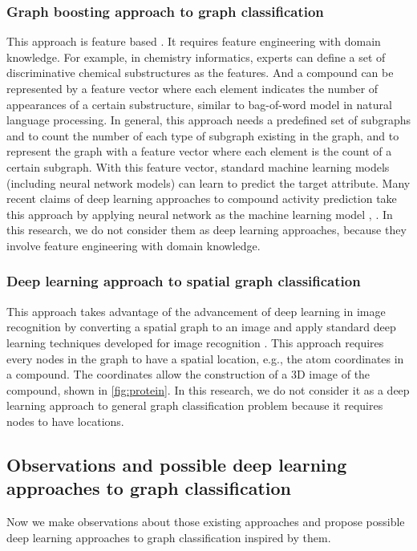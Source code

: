 \documentclass{article}
\begin{document}
\subsubsection{Graph boosting approach to graph classification}
This approach is feature based \cite{saigo2009gboost}.
It requires feature engineering with domain knowledge.
For example, in chemistry informatics, experts can define a set of discriminative chemical substructures as the features.
And a compound can be represented by a feature vector where each element indicates
the number of appearances of a certain substructure,
similar to bag-of-word model in natural language processing.
In general, this approach needs a predefined set of subgraphs and
to count the number of each type of subgraph existing in the graph, and
to represent the graph with a feature vector where each element is the count of a certain subgraph.
With this feature vector, standard machine learning models (including neural network models) can learn to predict the target attribute.
Many recent claims of deep learning approaches to compound activity prediction
take this approach by applying neural network as the machine learning model
\cite{unterthiner2015toxicity}, \cite{unterthiner2014deep} \cite{ramsundar2015massively}.
In this research, we do not consider them as deep learning approaches,
because they involve feature engineering with domain knowledge.

\subsubsection{Deep learning approach to spatial graph classification}
This approach takes advantage of the advancement of deep learning in image recognition by converting a spatial graph to an image and
apply standard deep learning techniques developed for image recognition \cite{wallach2015atomnet}.
This approach requires every nodes in the graph to have a spatial location,
 e.g., the atom coordinates in a compound.
The coordinates allow the construction of a 3D image of the compound,
shown in \autoref{fig:protein}.
In this research, we do not consider it as a deep learning approach to general
graph classification problem because it requires nodes to have locations.

\subsection{Observations and possible deep learning approaches to graph classification}
Now we make observations about those existing approaches and
propose possible deep learning approaches to graph classification inspired by them.
\end{document}
